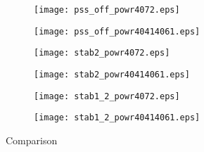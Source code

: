 \documentclass[a4paper, 10pt, openany]{memoir}
\begin{document}
    \begin{figure}[t!] %
        \begin{subfigure}{0.5\textwidth}
            \texttt{[image: pss\_off\_powr4072.eps]}
             \label{fig:pss_off_p4072}
        \end{subfigure}\hspace*{\fill}
        \begin{subfigure}{0.5\textwidth}
            \texttt{[image: pss\_off\_powr40414061.eps]}
             \label{fig:pss_off_pflow}
        \end{subfigure}

        \medskip
        \begin{subfigure}{0.5\textwidth}
            \texttt{[image: stab2\_powr4072.eps]}
             \label{fig:stab2_p4072}
        \end{subfigure}\hspace*{\fill}
        \begin{subfigure}{0.5\textwidth}
            \texttt{[image: stab2\_powr40414061.eps]}
             \label{fig:stab2_pflow}
        \end{subfigure}

        \medskip
        \begin{subfigure}{0.5\textwidth}
            \texttt{[image: stab1\_2\_powr4072.eps]}
             \label{fig:stab1_2_p4072}
        \end{subfigure}\hspace*{\fill}
        \begin{subfigure}{0.5\textwidth}
            \texttt{[image: stab1\_2\_powr40414061.eps]}
             \label{fig:stab1_2_pflow}
        \end{subfigure}

        \caption{Comparison} \label{fig:pss_comparison}
    \end{figure}
\end{document}
